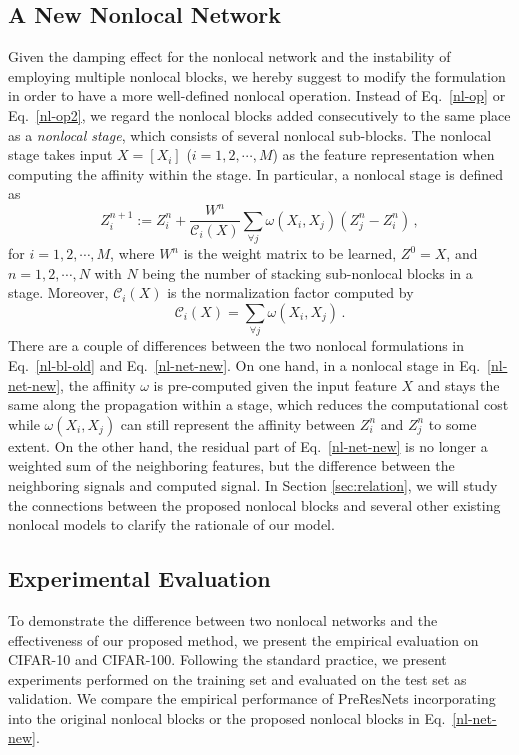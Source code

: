 \documentclass{article}
\begin{document}
\subsection{A New Nonlocal Network}
Given the damping effect for the nonlocal network and the instability of employing multiple nonlocal blocks, we hereby suggest to modify the formulation in order to have a more well-defined nonlocal operation. Instead of Eq.~\eqref{nl-op} or Eq.~\eqref{nl-op2}, we regard the nonlocal blocks added consecutively to the same place as a \textit{nonlocal stage}, which consists of several nonlocal sub-blocks. The nonlocal stage takes input $X=[X_i]$ ($i=1,2,\cdots,M$) as the feature representation when computing the affinity within the stage. In particular, a nonlocal stage is defined as
\begin{equation}\label{nl-net-new}
Z^{n+1}_i := Z^n_i + \frac{W^n}{\mathcal{C}_i(X)}\sum_{\forall j} \omega(X_i,X_j)(Z^n_j-Z^n_i)\,,
\end{equation}
for $i=1,2,\cdots,M$, where $W^n$ is the weight matrix to be learned, $Z^0=X$, and $n=1,2,\cdots,N$ with $N$ being the number of stacking sub-nonlocal blocks in a stage. Moreover, $\mathcal{C}_i(X)$ is the normalization factor computed by
\begin{equation}
\mathcal{C}_i(X)=\sum_{\forall j} \omega(X_i,X_j)\,.
\end{equation}
There are a couple of differences between the two nonlocal formulations
in Eq.~\eqref{nl-bl-old} and Eq.~\eqref{nl-net-new}. On one hand, in a nonlocal stage in Eq.~\eqref{nl-net-new}, the affinity $\omega$ is pre-computed given the input feature $X$ and stays the same along the propagation within a stage, which reduces the computational cost while $\omega(X_i,X_j)$ can still represent the affinity between $Z^n_i$ and $Z^n_j$ to some extent. On the other hand, the residual part of  Eq.~\eqref{nl-net-new} is no longer a weighted sum of the neighboring features, but the difference between the neighboring signals and computed signal. In Section \ref{sec:relation}, we will study the connections between the proposed nonlocal blocks and several other existing nonlocal models to clarify the rationale of our model.



\subsection{Experimental Evaluation}
To demonstrate the difference between two nonlocal networks and the effectiveness of our proposed method, we present the empirical evaluation on CIFAR-10 and CIFAR-100. Following the standard practice, we present experiments performed on the training set and evaluated on the test set as validation. We compare the empirical performance of PreResNets incorporating into the original nonlocal blocks \cite{wang2017non} or the proposed nonlocal blocks in Eq.~\eqref{nl-net-new}.
\end{document}
